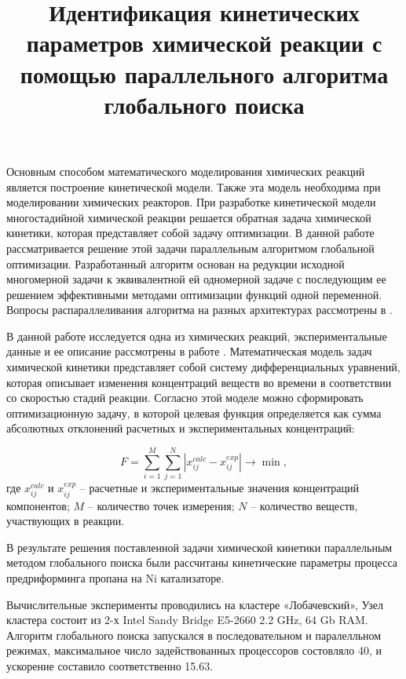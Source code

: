 \documentclass[11pt, oneside, a4paper]{article}
\begin{document}

\title{Идентификация кинетических параметров химической реакции с помощью параллельного алгоритма глобального поиска }


Основным способом математического моделирования химических реакций является построение кинетической модели. Также эта модель необходима при моделировании химических реакторов. При разработке кинетической модели многостадийной химической реакции решается обратная задача химической кинетики, которая представляет собой задачу оптимизации. В данной работе рассматривается решение этой задачи параллельным алгоритмом глобальной оптимизации.  Разработанный алгоритм основан на редукции исходной многомерной задачи к эквивалентной ей одномерной задаче с последующим ее решением эффективными методами оптимизации функций одной переменной. Вопросы распараллеливания алгоритма на разных архитектурах рассмотрены в \cite{Strongin13, Barkalov2016}. 

В данной работе исследуется одна из химических реакций, экспериментальные данные и ее описание рассмотрены в работе \cite {Uskov2020}. Математическая модель задач химической кинетики представляет собой систему дифференциальных уравнений, которая описывает изменения концентраций веществ во времени в соответствии со скоростью стадий реакции. Согласно этой моделе можно сформировать оптимизационную задачу, в которой целевая функция определяется как сумма абсолютных отклонений расчетных и экспериментальных концентраций:

\begin{displaymath}\label{func}
F = \sum\limits_{i=1}^M \sum\limits_{j=1}^N \left| x_{ij}^{calc} - x_{ij}^{exp} \right| \rightarrow \min,
\end{displaymath}
где $ x_ {ij} ^ {calc} $ и $ x_ {ij} ^ {exp} $ -- расчетные и экспериментальные значения концентраций компонентов; $ M $ -- количество точек измерения; $ N $ -- количество веществ, участвующих в реакции.


В результате решения поставленной задачи химической кинетики параллельным методом глобального поиска были рассчитаны кинетические параметры процесса предриформинга пропана на Ni катализаторе.

Вычислительные эксперименты проводились на кластере «Лобачевский», Узел кластера состоит из 2-х Intel Sandy Bridge E5-2660 2.2 GHz, 64 Gb RAM. Алгоритм глобального поиска запускался в последовательном и паралелльном режимах, максимальное число задействованных процессоров состовляло 40, и ускорение составило соответственно 15.63.
\end{document}
